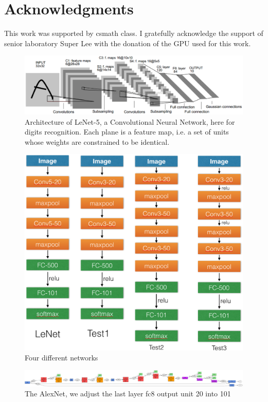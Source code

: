 \documentclass{article}
\begin{document}
\section{Acknowledgments}
This work was supported by csmath class. I gratefully acknowledge the support of senior laboratory Super Lee with the donation of the GPU used for this work. \newline \newline
\begin{figure}[b!]
	\centering
	\includegraphics[width=0.9\columnwidth]{figure_1}
	\caption{Architecture of LeNet-5, a Convolutional Neural Network, here for digits recognition. Each plane is a feature map, i.e. a set of units whose weights are constrained to be identical.}
	\label{fig:1}
\end{figure}
\begin{figure}
	\centering
	\includegraphics[width=0.9\columnwidth]{test_net}
	\caption{Four different networks}
	\label{fig:2}
\end{figure}
\begin{figure}[b!]
	\centering
	\includegraphics[width=0.9\columnwidth]{deepnet}
	\caption{The AlexNet, we adjust the last layer fc8 output unit 20 into 101}
	\label{fig:3}
\end{figure}
\end{document}
